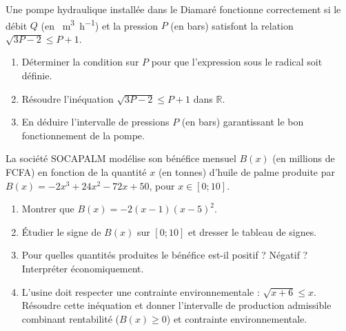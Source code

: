 \documentclass[11pt]{article}
\begin{document}
\begin{exercice}
Une pompe hydraulique installée dans le Diamaré fonctionne correctement si le débit $Q$ (en \SI{}{\meter\cubed\per\hour}) et la pression $P$ (en bars) satisfont la relation $\sqrt{3P - 2} \le P + 1$.
\begin{enumerate}
    \item Déterminer la condition sur $P$ pour que l'expression sous le radical soit définie.
    \item Résoudre l'inéquation $\sqrt{3P - 2} \le P + 1$ dans $\mathbb{R}$.
    \item En déduire l'intervalle de pressions $P$ (en bars) garantissant le bon fonctionnement de la pompe.
\end{enumerate}
\end{exercice}

\begin{exercice}
La société SOCAPALM modélise son bénéfice mensuel $B(x)$ (en millions de FCFA) en fonction de la quantité $x$ (en tonnes) d'huile de palme produite par $B(x) = -2x^3 + 24x^2 - 72x + 50$, pour $x \in [0; 10]$.
\begin{enumerate}
    \item Montrer que $B(x) = -2(x-1)(x-5)^2$.
    \item Étudier le signe de $B(x)$ sur $[0; 10]$ et dresser le tableau de signes.
    \item Pour quelles quantités produites le bénéfice est-il positif ? Négatif ? Interpréter économiquement.
    \item L'usine doit respecter une contrainte environnementale : $\sqrt{x+6} \le x$. Résoudre cette inéquation et donner l'intervalle de production admissible combinant rentabilité ($B(x) \ge 0$) et contrainte environnementale.
\end{enumerate}
\end{exercice}
\end{document}
